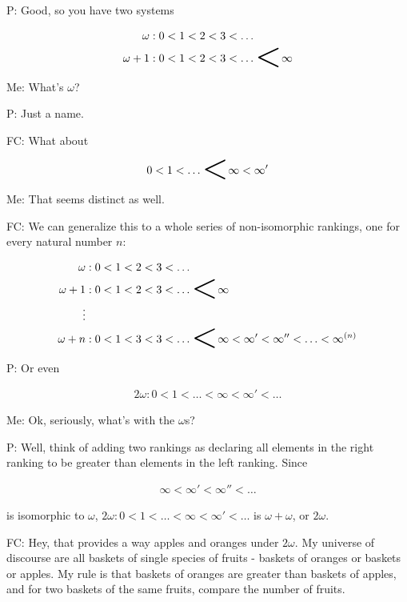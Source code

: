 \documentclass[a4paper,12pt]{article}
\begin{document}
P: Good, so you have two systems

\begin{align*}
\omega&: 0 < 1 < 2 < 3 < \ldots \\
\omega+1&: 0 < 1 < 2 < 3 < \ldots \raisebox{-0.375em}{\scalebox{3}{$<$}} \infty
\end{align*}

Me: What's $\omega$?

P: Just a name.

FC: What about

\begin{align*}
0 < 1 < \ldots \raisebox{-0.375em}{\scalebox{3}{$<$}} \infty < \infty'
\end{align*}

Me: That seems distinct as well.

FC: We can generalize this to a whole series of non-isomorphic rankings, one for every natural number $n$:

\begin{align*}
\omega&: 0 < 1 < 2 < 3 < \ldots \\
\omega+1&: 0 < 1 < 2 < 3 < \ldots \raisebox{-0.375em}{\scalebox{3}{$<$}} \infty \\
\vdots \\
\omega+n&: 0 < 1 < 3 < 3 < \ldots \raisebox{-0.375em}{\scalebox{3}{$<$}} \infty < \infty' < \infty'' < \ldots < \infty^{(n)}
\end{align*}

P: Or even

\begin{align*}
2\omega: 0 < 1 < \ldots < \infty < \infty' < \ldots
\end{align*}

Me: Ok, seriously, what's with the $\omega$s?

P: Well, think of adding two rankings as declaring all elements in the right ranking to be greater than elements in the left ranking. Since

\begin{align*}
\infty < \infty' < \infty'' < \ldots
\end{align*}

is isomorphic to $\omega$, $2\omega: 0 < 1 < \ldots < \infty < \infty' < \ldots$ is $\omega + \omega$, or $2\omega$.

FC: Hey, that provides a way apples and oranges under $2\omega$. My universe of discourse are all baskets of single species of fruits - baskets of oranges or baskets or apples. My rule is that baskets of oranges are greater than baskets of apples, and for two baskets of the same fruits, compare the number of fruits.
\end{document}
